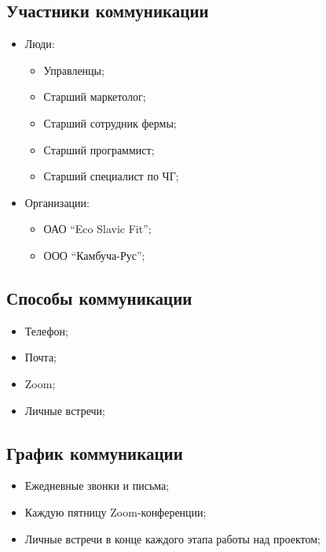 \documentclass[a4paper,10pt]{article}
\begin{document}
\subsection{Участники коммуникации}

    \begin{itemize}
    \item Люди:
        \begin{itemize}
            \item Управленцы;
            \item Старший маркетолог;
            \item Старший сотрудник фермы;
            \item Старший программист;
            \item Старший специалист по ЧГ;
        \end{itemize}
    \item Организации:
        \begin{itemize}
            \item ОАО ``Eco Slavic Fit'';
            \item ООО ``Камбуча-Рус'';
        \end{itemize}
    \end{itemize}

\subsection{Способы коммуникации}

    \begin{itemize}
        \item Телефон;
        \item Почта;
        \item Zoom;
        \item Личные встречи;
    \end{itemize}

\subsection{График коммуникации}

    \begin{itemize}
        \item Ежедневные звонки и письма;
        \item Каждую пятницу Zoom-конференции;
        \item Личные встречи в конце каждого этапа работы над проектом;
    \end{itemize}
\end{document}
